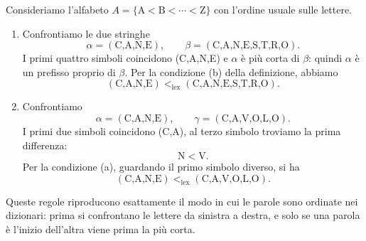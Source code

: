 \begin{esempio}
Consideriamo l'alfabeto $A=\{\text{A}<\text{B}<\cdots<\text{Z}\}$ con l'ordine usuale sulle lettere.
\begin{enumerate}
    \item Confrontiamo le due stringhe
    \[
        \alpha = (\text{C,A,N,E}), \qquad
        \beta = (\text{C,A,N,E,S,T,R,O}).
\]
    I primi quattro simboli coincidono (C,A,N,E) e $\alpha$ è più corta di $\beta$:
    quindi $\alpha$ è un prefisso proprio di $\beta$.
    Per la condizione (b) della definizione, abbiamo
    \[
    (\text{C,A,N,E}) <_{\text{lex}} (\text{C,A,N,E,S,T,R,O}).
    \]


    \item  Confrontiamo
    \[
        \alpha = (\text{C,A,N,E}), \qquad
        \gamma = (\text{C,A,V,O,L,O}).
        \]
    I primi due simboli coincidono (C,A), al terzo simbolo troviamo la prima differenza:
    \[
        \text{N} < \text{V}.
    \]
    Per la condizione (a), guardando il primo simbolo diverso, si ha
\[
(\text{C,A,N,E}) <_{\text{lex}} (\text{C,A,V,O,L,O}).
\]
    
\end{enumerate}

Queste regole riproducono esattamente il modo in cui le parole sono ordinate nei dizionari:
prima si confrontano le lettere da sinistra a destra, e solo se una parola è l'inizio dell'altra
viene prima la più corta.
\end{esempio}
















